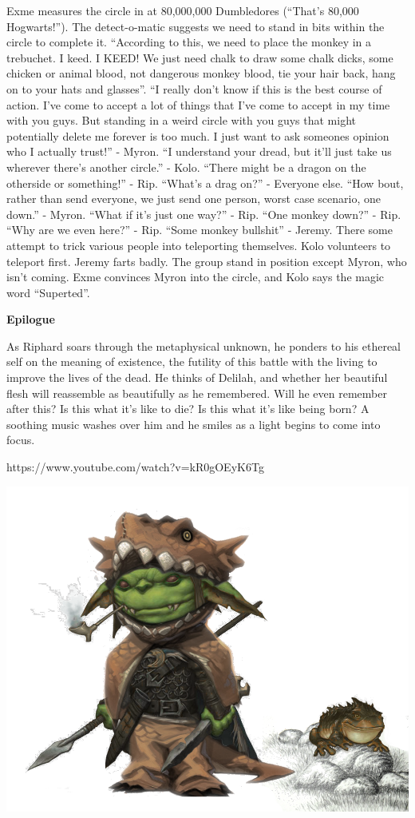 Exme measures the circle in at 80,000,000 Dumbledores (“That’s 80,000 Hogwarts!”). The detect-o-matic suggests we need to stand in bits within the circle to complete it. “According to this, we need to place the monkey in a trebuchet. I keed. I KEED! We just need chalk to draw some chalk dicks, some chicken or animal blood, not dangerous monkey blood, tie your hair back, hang on to your hats and glasses''. “I really don’t know if this is the best course of action. I’ve come to accept a lot of things that I’ve come to accept in my time with you guys. But standing in a weird circle with you guys that might potentially delete me forever is too much. I just want to ask someones opinion who I actually trust!” - Myron. “I understand your dread, but it’ll just take us wherever there’s another circle.” - Kolo. “There might be a dragon on the otherside or something!” - Rip. “What’s a drag on?” - Everyone else. “How bout, rather than send everyone, we just send one person, worst case scenario, one down.” - Myron. “What if it’s just one way?” - Rip. “One monkey down?” - Rip. “Why are we even here?” - Rip. “Some monkey bullshit” - Jeremy. There some attempt to trick various people into teleporting themselves. Kolo volunteers to teleport first. Jeremy farts badly. The group stand in position except Myron, who isn’t coming. Exme convinces Myron into the circle, and Kolo says the magic word “Superted”.\medskip

\textbf{Epilogue}

As Riphard soars through the metaphysical unknown, he ponders to his ethereal self on the meaning of existence, the futility of this battle with the living to improve the lives of the dead. He thinks of Delilah, and whether her beautiful flesh will reassemble as beautifully as he remembered. Will he even remember after this? Is this what it’s like to die? Is this what it’s like being born? A soothing music washes over him and he smiles as a light begins to come into focus.\medskip

https://www.youtube.com/watch?v=kR0gOEyK6Tg

\begin{center}
\includegraphics[width=\textwidth]{./content/img/krokokolo.png}
\begin{figure}[h]
\end{figure}
\end{center}



\vspace*{5mm}



\clearpage
